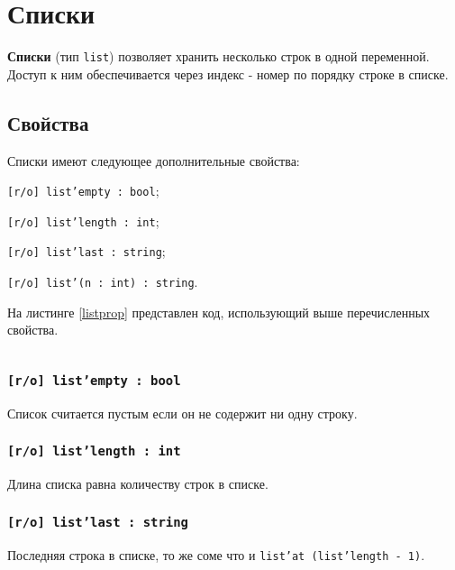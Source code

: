\section{Списки}

{\bf Списки} (тип \texttt{list}) позволяет хранить несколько строк в одной переменной. Доступ к ним обеспечивается через индекс - номер по порядку строке в списке.

\subsection{Свойства}

Списки имеют следующее дополнительные свойства:
\begin{icItems}
\item
	\texttt{[r/o] list'empty : bool};
\item
	\texttt{[r/o] list'length : int};
\item
	\texttt{[r/o] list'last : string};
\item
	\texttt{[r/o] list'(n : int) : string}.
\end{icItems}

На листинге \ref{listprop} представлен код, использующий выше перечисленных свойства.

\begin{sourcecode}
	\label{listprop}
    \inputminted[linenos]{icl}{../sources/listprop.icL}
\end{sourcecode}

\subsubsection{\texttt{[r/o] list'empty : bool}}

Список считается пустым если он не содержит ни одну строку.

\subsubsection{\texttt{[r/o] list'length : int}}

Длина списка равна количеству строк в списке.

\subsubsection{\texttt{[r/o] list'last : string}}

Последняя строка в списке, то же соме что и \texttt{list'at (list'length - 1)}.

